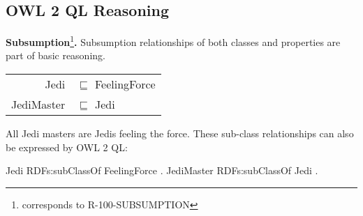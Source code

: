\documentclass{llncs}
\newcommand{\ms}[1]{\texttt{#1}}
\newenvironment{DL}{
  \vspace{0cm}
  \begin{tabular}{r l}

}{
  \end{tabular}
}
\begin{document}
%

\subsection{OWL 2 QL Reasoning}

\textbf{Subsumption}\footnote{corresponds to R-100-SUBSUMPTION}\textbf{.}
Subsumption relationships of both classes and properties are part of basic reasoning.

\begin{center}
\begin{DL}
Jedi &$\sqsubseteq$ FeelingForce \\
JediMaster &$\sqsubseteq$ Jedi \\
\end{DL}
\end{center}

All Jedi masters are Jedis feeling the force.
These sub-class relationships can also be expressed by OWL 2 QL:

\begin{ex}
Jedi RDFs:subClassOf FeelingForce . 
JediMaster RDFs:subClassOf Jedi . 
\end{ex}
\end{document}
